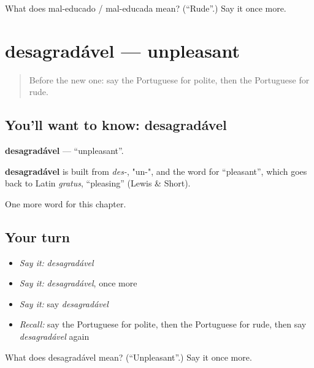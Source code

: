 \begin{tcolorbox}[breakable,colback=teal!4,colframe=teal!35!black,title={Before you move on}]
What does mal-educado / mal-educada mean? (\textquotedblleft{}Rude\textquotedblright{}.) Say it once more.
\end{tcolorbox}
\section[desagradável]{desagradável — unpleasant}

\label{lesson:PT-C153-desagradavel}



\begin{quote}
Before the new one: say the Portuguese for polite, then the Portuguese for rude.
\end{quote}

\subsection*{You'll want to know: desagradável}
\textbf{desagradável} — \textquotedblleft{}unpleasant\textquotedblright{}.

\begin{cousinweb}
\textbf{desagradável} is built from \emph{des-}, "un-", and the word for \textquotedblleft{}pleasant\textquotedblright{}, which goes back to Latin \emph{gratus}, \textquotedblleft{}pleasing\textquotedblright{} (Lewis \& Short).
\end{cousinweb}

\begin{grammarlens}[title={What you've built}]
One more word for this chapter.
\end{grammarlens}

\subsection*{Your turn}
\begin{itemize}
\raggedright
  \item \emph{Say it:} \emph{desagradável}
  \item \emph{Say it:} \emph{desagradável}, once more
  \item \emph{Say it:} say \emph{desagradável}
  \item \emph{Recall:} say the Portuguese for polite, then the Portuguese for rude, then say \emph{desagradável} again
\end{itemize}

\begin{tcolorbox}[breakable,colback=teal!4,colframe=teal!35!black,title={Before you move on}]
What does desagradável mean? (\textquotedblleft{}Unpleasant\textquotedblright{}.) Say it once more.
\end{tcolorbox}
